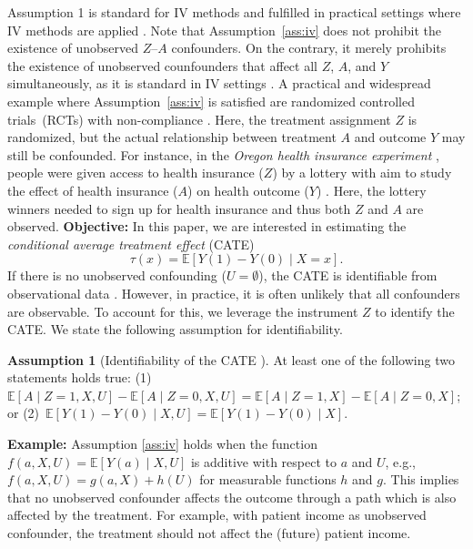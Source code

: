 \documentclass{article} %
\newcommand{\E}{\mathbb{E}}
\theoremstyle{definition}
\newtheorem{assumption}{Assumption}
\theoremstyle{plain}
\begin{document}
Assumption 1 is standard for IV methods and fulfilled in practical settings where IV methods are applied \citep{Angrist.1990, Angrist.1991, Imbens.1994}. Note that Assumption~\ref{ass:iv} does not prohibit the existence of unobserved $Z$--$A$ confounders. On the contrary, it merely prohibits the existence of unobserved counfounders that affect all $Z$, $A$, and $Y$ simultaneously, as it is standard in IV settings \citep{Wooldridge.2013}. A practical and widespread example where Assumption~\ref{ass:iv} is satisfied are randomized controlled trials~(RCTs) with non-compliance \citep{Imbens.1994}. Here, the treatment assignment $Z$ is randomized, but the actual relationship between treatment $A$ and outcome $Y$ may still be confounded. For instance, in the \emph{Oregon health insurance experiment} \citep{Finkelstein.2012}, people were given access to health insurance ($Z$) by a lottery with aim to study the effect of health insurance ($A$) on health outcome ($Y$) \citep{Finkelstein.2012}. Here, the lottery winners needed to sign up for health insurance and thus both $Z$ and $A$ are observed.
\textbf{Objective:}
In this paper, we are interested in estimating the \emph{conditional average treatment effect} (CATE)
\begin{equation}
 \tau(x) = \E[Y(1) - Y(0) \mid X = x].
\end{equation}
If there is no unobserved confounding ($U = \emptyset$), the CATE is identifiable from observational data \citep{Shalit.2017}. However, in practice, it is often unlikely that all confounders are observable. To account for this, we leverage the instrument $Z$ to identify the CATE. We state the following assumption for identifiability.

\begin{assumption}[Identifiability of the CATE \citep{Wang.2018}]\label{ass:identification}
 At least one of the following two statements holds true: (1)~$\E[A \mid Z=1, X, U] - \E[A \mid Z=0, X, U] = \E[A \mid Z=1, X] - \E[A \mid Z=0, X]$;
 or (2)~$\E[Y(1) - Y(0) \mid X, U] = \E[Y(1) - Y(0) \mid X]$. 
\end{assumption}
\textbf{Example:} Assumption \ref{ass:iv} holds when the function $f(a, X, U) = \E[Y(a) \mid X, U]$ is additive with respect to $a$ and $U$, e.g., $f(a,X, U) = g(a, X) + h(U)$ for measurable functions $h$ and $g$. This implies that no unobserved confounder affects the outcome through a path which is also affected by the treatment. For example, with patient income as unobserved confounder, the treatment should not affect the (future) patient income.
\end{document}
